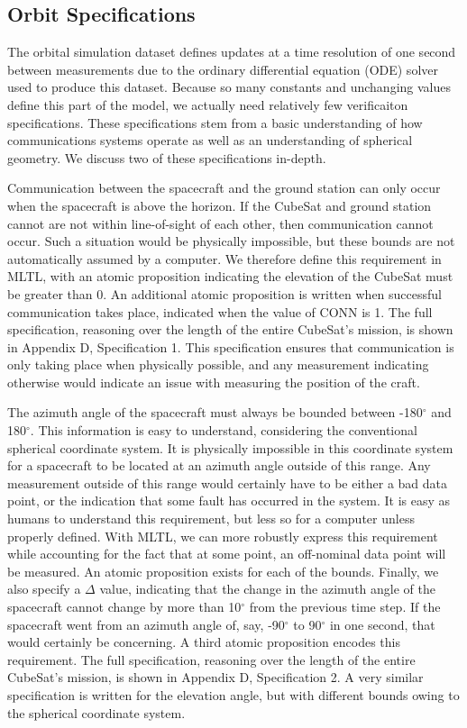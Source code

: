 \documentclass[conf]{new-aiaa}
\begin{document}
\subsection{Orbit Specifications}
\label{ref:orbitspec}

The orbital simulation dataset defines updates at a time resolution of one second between measurements due to the ordinary differential equation (ODE) solver used to produce this dataset. Because so many constants and unchanging values define this part of the model, we actually need relatively few verificaiton specifications. These specifications stem from a basic understanding of how communications systems operate as well as an understanding of spherical geometry. We discuss two of these specifications in-depth. 

Communication between the spacecraft and the ground station can only occur when the spacecraft is above the horizon. If the CubeSat and ground station cannot are not within line-of-sight of each other, then communication cannot occur. Such a situation would be physically impossible, but these bounds are not automatically assumed by a computer. We therefore define this requirement in MLTL, with an atomic proposition indicating the elevation of the CubeSat must be greater than 0. An additional atomic proposition is written when successful communication takes place, indicated when the value of CONN is 1. The full specification, reasoning over the length of the entire CubeSat's mission, is shown in Appendix D, Specification 1. This specification ensures that communication is only taking place when physically possible, and any measurement indicating otherwise would indicate an issue with measuring the position of the craft.

The azimuth angle of the spacecraft must always be bounded between -180$^{\circ}$ and 180$^{\circ}$. This information is easy to understand, considering the conventional spherical coordinate system. It is physically impossible in this coordinate system for a spacecraft to be located at an azimuth angle outside of this range. Any measurement outside of this range would certainly have to be either a bad data point, or the indication that some fault has occurred in the system. It is easy as humans to understand this requirement, but less so for a computer unless properly defined. With MLTL, we can more robustly express this requirement while accounting for the fact that at some point, an off-nominal data point will be measured. An atomic proposition exists for each of the bounds. Finally, we also specify a $\Delta$ value, indicating that the change in the azimuth angle of the spacecraft cannot change by more than 10$^{\circ}$ from the previous time step. If the spacecraft went from an azimuth angle of, say, -90$^{\circ}$ to 90$^{\circ}$ in one second, that would certainly be concerning. A third atomic proposition encodes this requirement. The full specification, reasoning over the length of the entire CubeSat's mission, is shown in Appendix D, Specification 2. A very similar specification is written for the elevation angle, but with different bounds owing to the spherical coordinate system.
\end{document}
